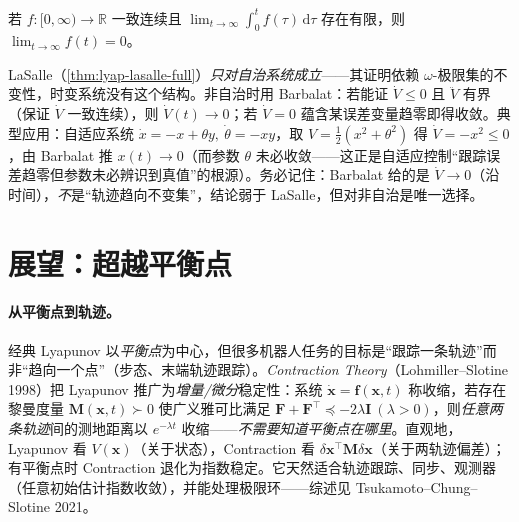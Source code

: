 \begin{theorem}
\label{thm:lyap-barbalat}
若 $f:[0,\infty)\to\mathbb{R}$ 一致连续且 $\lim_{t\to\infty}\int_0^t f(\tau)\,\mathrm d\tau$ 存在有限，则 $\lim_{t\to\infty}f(t)=0$\cite{barbalat1959systemes}。
\end{theorem}

\begin{insight}
LaSalle（\cref{thm:lyap-lasalle-full}）\emph{只对自治系统成立}——其证明依赖 $\omega$-极限集的不变性，时变系统没有这个结构。非自治时用 Barbalat：若能证 $\dot V\le0$ 且 $\ddot V$ 有界（保证 $\dot V$ 一致连续），则 $\dot V(t)\to0$；若 $\dot V=0$ 蕴含某误差变量趋零即得收敛。典型应用：自适应系统 $\dot x=-x+\theta y,\ \dot\theta=-xy$，取 $V=\tfrac12(x^2+\theta^2)$ 得 $\dot V=-x^2\le0$，由 Barbalat 推 $x(t)\to0$（而参数 $\theta$ 未必收敛——这正是自适应控制“跟踪误差趋零但参数未必辨识到真值”的根源）。务必记住：Barbalat 给的是 $\dot V\to0$（沿时间），\emph{不}是“轨迹趋向不变集”，结论弱于 LaSalle，但对非自治是唯一选择。
\end{insight}

\section{展望：超越平衡点}
\label{sec:lyap-outlook}

\paragraph{从平衡点到轨迹。}
经典 Lyapunov 以\emph{平衡点}为中心，但很多机器人任务的目标是“跟踪一条轨迹”而非“趋向一个点”（步态、末端轨迹跟踪）。\emph{Contraction Theory}（Lohmiller–Slotine 1998\cite{lohmiller1998contraction}）把 Lyapunov 推广为\emph{增量/微分}稳定性：系统 $\dot{\mathbf{x}}=\mathbf{f}(\mathbf{x},t)$ 称收缩，若存在黎曼度量 $\mathbf{M}(\mathbf{x},t)\succ0$ 使广义雅可比满足 $\mathbf{F}+\mathbf{F}^\top\preceq-2\lambda\mathbf{I}\ (\lambda>0)$，则\emph{任意两条轨迹}间的测地距离以 $e^{-\lambda t}$ 收缩——\emph{不需要知道平衡点在哪里}。直观地，Lyapunov 看 $V(\mathbf{x})$（关于状态），Contraction 看 $\delta\mathbf{x}^\top\mathbf{M}\delta\mathbf{x}$（关于两轨迹偏差）；有平衡点时 Contraction 退化为指数稳定。它天然适合轨迹跟踪、同步、观测器（任意初始估计指数收敛），并能处理极限环——综述见 Tsukamoto–Chung–Slotine 2021\cite{tsukamoto2021contraction}。

